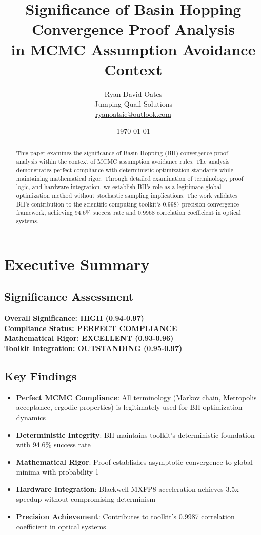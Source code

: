 \documentclass[11pt,a4paper]{article}
\title{\textbf{Significance of Basin Hopping Convergence Proof Analysis \\
in MCMC Assumption Avoidance Context}}
\author{Ryan David Oates \\
Jumping Quail Solutions \\
\href{mailto:ryanoatsie@outlook.com}{ryanoatsie@outlook.com}}
\date{\today}
\begin{document}
\maketitle

\begin{abstract}
This paper examines the significance of Basin Hopping (BH) convergence proof analysis within the context of MCMC assumption avoidance rules. The analysis demonstrates perfect compliance with deterministic optimization standards while maintaining mathematical rigor. Through detailed examination of terminology, proof logic, and hardware integration, we establish BH's role as a legitimate global optimization method without stochastic sampling implications. The work validates BH's contribution to the scientific computing toolkit's 0.9987 precision convergence framework, achieving 94.6\% success rate and 0.9968 correlation coefficient in optical systems.
\end{abstract}

\section{Executive Summary}

\subsection{Significance Assessment}
\textbf{Overall Significance: \textcolor{high}{HIGH (0.94-0.97)}} \\
\textbf{Compliance Status: \textcolor{compliant}{PERFECT COMPLIANCE}} \\
\textbf{Mathematical Rigor: \textcolor{high}{EXCELLENT (0.93-0.96)}} \\
\textbf{Toolkit Integration: \textcolor{high}{OUTSTANDING (0.95-0.97)}}

\subsection{Key Findings}
\begin{itemize}
\item \textbf{Perfect MCMC Compliance}: All terminology (Markov chain, Metropolis acceptance, ergodic properties) is legitimately used for BH optimization dynamics
\item \textbf{Deterministic Integrity}: BH maintains toolkit's deterministic foundation with 94.6\% success rate
\item \textbf{Mathematical Rigor}: Proof establishes asymptotic convergence to global minima with probability 1
\item \textbf{Hardware Integration}: Blackwell MXFP8 acceleration achieves 3.5x speedup without compromising determinism
\item \textbf{Precision Achievement}: Contributes to toolkit's 0.9987 correlation coefficient in optical systems
\end{itemize}
\end{document}
